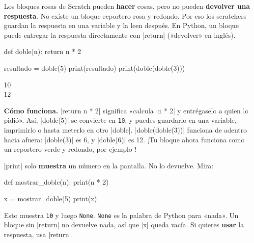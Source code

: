 Los bloques rosas de Scratch pueden \textbf{hacer} cosas, pero no pueden \textbf{devolver una respuesta}. No existe un bloque reportero rosa y redondo. Por eso los scratchers guardan la respuesta en una variable y la leen después. En Python, un bloque puede entregar la respuesta directamente con \py|return| («devolver» en inglés).

\begin{tcbraster}[raster columns=2, raster equal height=rows, raster column skip=12pt, raster valign=center, raster force size=false, raster column 1/.style={add to width=-2cm}, raster column 2/.style={add to width=2cm}]
\begin{tcolorbox}[colback=white, colframe=white, boxrule=0pt, valign=center]
\begin{scratch}
\end{scratch}
\par\medskip
\begin{scratch}
\end{scratch}
\end{tcolorbox}
\begin{code}
def doble(n):
    return n * 2

resultado = doble(5)
print(resultado)
print(doble(doble(3)))
\end{code}
\end{tcbraster}

\begin{outputbox}
10\\
12
\end{outputbox}

\textbf{Cómo funciona.} \py|return n * 2| significa «calcula \py|n * 2| y entrégaselo a quien lo pidió». Así, \py|doble(5)| se convierte en \texttt{10}, y puedes guardarlo en una variable, imprimirlo o hasta meterlo en otro \py|doble|. \py|doble(doble(3))| funciona de adentro hacia afuera: \py|doble(3)| es 6, y \py|doble(6)| es 12. ¡Tu bloque ahora funciona como un reportero verde y redondo, por ejemplo !

\begin{watchout}
\py|print| solo \textbf{muestra} un número en la pantalla. No lo devuelve. Mira:
\begin{code}
def mostrar_doble(n):
    print(n * 2)

x = mostrar_doble(5)
print(x)
\end{code}
Esto muestra \texttt{10} y luego \texttt{None}. \texttt{None} es la palabra de Python para «nada». Un bloque sin \py|return| no devuelve nada, así que \py|x| queda vacía. Si quieres \textbf{usar} la respuesta, usa \py|return|.
\end{watchout}

